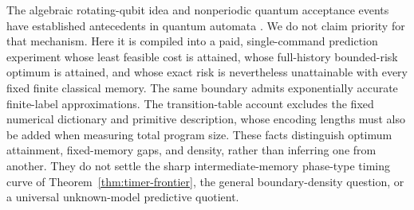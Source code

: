 The algebraic rotating-qubit idea and nonperiodic quantum acceptance events have established antecedents in quantum automata \cite{Mereghetti24}. We do not claim priority for that mechanism. Here it is compiled into a paid, single-command prediction experiment whose least feasible cost is attained, whose full-history bounded-risk optimum is attained, and whose exact risk is nevertheless unattainable with every fixed finite classical memory. The same boundary admits exponentially accurate finite-label approximations. The transition-table account excludes the fixed numerical dictionary and primitive description, whose encoding lengths must also be added when measuring total program size. These facts distinguish optimum attainment, fixed-memory gaps, and density, rather than inferring one from another. They do not settle the sharp intermediate-memory phase-type timing curve of Theorem~\ref{thm:timer-frontier}, the general boundary-density question, or a universal unknown-model predictive quotient.
